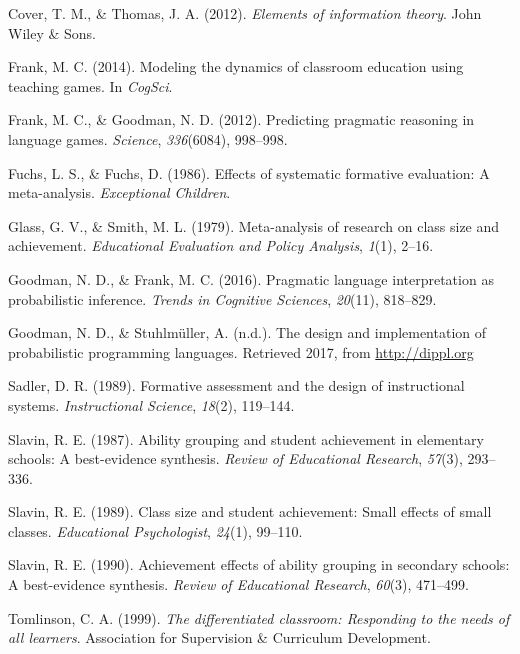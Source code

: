 \documentclass[10pt, letterpaper]{article}
\begin{document}
\hypertarget{ref-cover2012}{}
Cover, T. M., \& Thomas, J. A. (2012). \emph{Elements of information
theory}. John Wiley \& Sons.

\hypertarget{ref-frank2014}{}
Frank, M. C. (2014). Modeling the dynamics of classroom education using
teaching games. In \emph{CogSci}.

\hypertarget{ref-frank2012}{}
Frank, M. C., \& Goodman, N. D. (2012). Predicting pragmatic reasoning
in language games. \emph{Science}, \emph{336}(6084), 998--998.

\hypertarget{ref-fuchs1986}{}
Fuchs, L. S., \& Fuchs, D. (1986). Effects of systematic formative
evaluation: A meta-analysis. \emph{Exceptional Children}.

\hypertarget{ref-glass1979}{}
Glass, G. V., \& Smith, M. L. (1979). Meta-analysis of research on class
size and achievement. \emph{Educational Evaluation and Policy Analysis},
\emph{1}(1), 2--16.

\hypertarget{ref-goodman2016}{}
Goodman, N. D., \& Frank, M. C. (2016). Pragmatic language
interpretation as probabilistic inference. \emph{Trends in Cognitive
Sciences}, \emph{20}(11), 818--829.

\hypertarget{ref-goodman2017}{}
Goodman, N. D., \& Stuhlmüller, A. (n.d.). The design and implementation
of probabilistic programming languages. Retrieved 2017, from
\url{http://dippl.org}

\hypertarget{ref-sadler1989}{}
Sadler, D. R. (1989). Formative assessment and the design of
instructional systems. \emph{Instructional Science}, \emph{18}(2),
119--144.

\hypertarget{ref-slavin1987}{}
Slavin, R. E. (1987). Ability grouping and student achievement in
elementary schools: A best-evidence synthesis. \emph{Review of
Educational Research}, \emph{57}(3), 293--336.

\hypertarget{ref-slavin1989}{}
Slavin, R. E. (1989). Class size and student achievement: Small effects
of small classes. \emph{Educational Psychologist}, \emph{24}(1),
99--110.

\hypertarget{ref-slavin1990}{}
Slavin, R. E. (1990). Achievement effects of ability grouping in
secondary schools: A best-evidence synthesis. \emph{Review of
Educational Research}, \emph{60}(3), 471--499.

\hypertarget{ref-tomlinson1999}{}
Tomlinson, C. A. (1999). \emph{The differentiated classroom: Responding
to the needs of all learners}. Association for Supervision \& Curriculum
Development.
\end{document}
